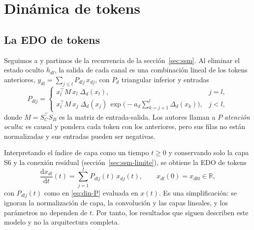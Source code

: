 
\makeatletter
{}
\makeatother

\section{Dinámica de tokens}
\label{sec:dinamica}

\subsection{La EDO de tokens}
\label{sec:din-edo}

Seguimos a \cite{vo2025token} y partimos de la recurrencia de la sección~\ref{sec:ssm}. Al eliminar el estado oculto $h_{dl}$, la salida de cada canal es una combinación lineal de los tokens anteriores, $y_{dl}=\sum_{j\le l}P_{dlj}\,x_{dj}$, con $P_d$ triangular inferior y entradas
\begin{equation}
  P_{dlj}=
  \begin{cases}
    x_l^{\top}M\,x_l\;\Delta_d(x_l), & j=l,\\[4pt]
    x_l^{\top}M\,x_j\;\Delta_d(x_j)\,\exp\!\Big(-a_d\displaystyle\sum_{k=j+1}^{l}\Delta_d(x_k)\Big), & j<l,
  \end{cases}
  \label{eq:din-P}
\end{equation}
donde $M=S_C^{\top}S_B$ es la matriz de entrada-salida. Los autores llaman a $P$ \emph{atención oculta}: es causal y pondera cada token con los anteriores, pero sus filas no están normalizadas y sus entradas pueden ser negativas.

Interpretando el índice de capa como un tiempo $t\ge0$ y conservando solo la capa S6 y la conexión residual (sección~\ref{sec:ssm-limite}), se obtiene la EDO de tokens
\begin{equation}
  \frac{\mathrm{d}x_{dl}}{\mathrm{d}t}(t)=\sum_{j=1}^{l}P_{dlj}(t)\,x_{dj}(t),
  \qquad x_{dl}(0)=x_{dl0}\in\mathbb{R},
  \label{eq:din-edo}
\end{equation}
con $P_{dlj}(t)$ como en \eqref{eq:din-P} evaluada en $x(t)$. Es una simplificación: se ignoran la normalización de capa, la convolución y las capas lineales, y los parámetros no dependen de $t$. Por tanto, los resultados que siguen describen este modelo y no la arquitectura completa.

